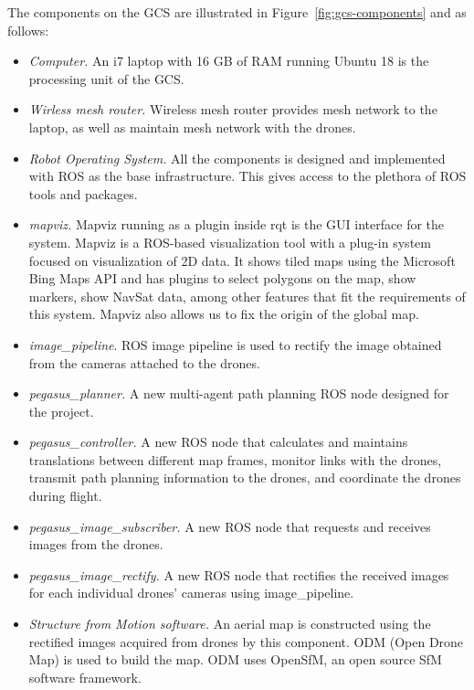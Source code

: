 The components on the GCS are illustrated in Figure~\ref{fig:gcs-components} and as follows:
\begin{itemize}
	\item \textit{Computer.} An i7 laptop with 16 GB of RAM running Ubuntu 18 is the processing unit of the GCS.
	\item \textit{Wirless mesh router.}  Wireless mesh router provides mesh network to the laptop, as well as maintain mesh network with the drones.
	\item \textit{Robot Operating System.} All the components is designed and implemented with ROS as the base infrastructure. This gives access to the plethora of ROS tools and packages.
	\item \textit{mapviz.} Mapviz running as a plugin inside rqt is the GUI interface for the system. Mapviz is a ROS-based visualization tool with a plug-in system focused on visualization of 2D data. It shows tiled maps using the Microsoft Bing Maps API and has plugins to select polygons on the map, show markers, show NavSat data, among other features that fit the requirements of this system. Mapviz also allows us to fix the origin of the global map.
	\item \textit{image\_pipeline}. ROS image pipeline is used to rectify the image obtained from the cameras attached to the drones.
	\item \textit{pegasus\_planner.} A new multi-agent path planning ROS node designed for the project.
	\item \textit{pegasus\_controller.} A new ROS node that calculates and maintains translations between different map frames, monitor links with the drones, transmit path planning information to the drones, and coordinate the drones during flight.
	\item \textit{pegasus\_image\_subscriber.} A new ROS node that requests and receives images from the drones.
	\item \textit{pegasus\_image\_rectify.} A new ROS node that rectifies the received images for each individual drones' cameras using image\_pipeline.  
	\item \textit{Structure from Motion software.} An aerial map is constructed using the rectified images acquired from drones by this component. ODM (Open Drone Map) is used to build the map. ODM uses OpenSfM, an open source SfM software framework.
\end{itemize}

